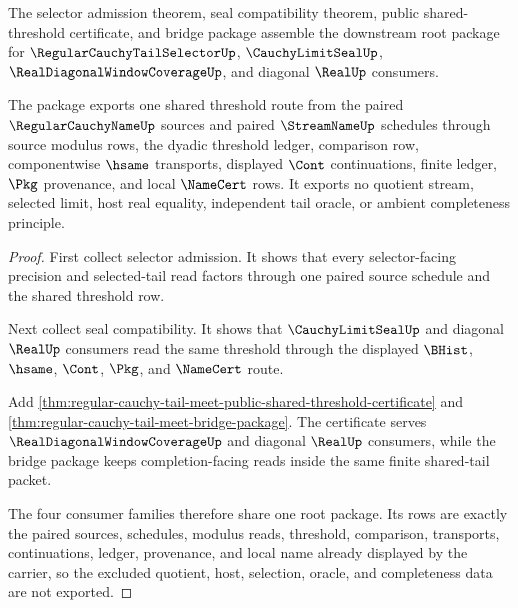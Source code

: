 \begin{theorem}
\label{thm:regular-cauchy-tail-meet-root-consumer-package}
The selector admission theorem, seal compatibility theorem, public shared-threshold certificate, and bridge package assemble the downstream root package for $\RegularCauchyTailSelectorUp$, $\CauchyLimitSealUp$, $\RealDiagonalWindowCoverageUp$, and diagonal $\RealUp$ consumers.

The package exports one shared threshold route from the paired $\RegularCauchyNameUp$ sources and paired $\StreamNameUp$ schedules through source modulus rows, the dyadic threshold ledger, comparison row, componentwise $\hsame$ transports, displayed $\Cont$ continuations, finite ledger, $\Pkg$ provenance, and local $\NameCert$ rows. It exports no quotient stream, selected limit, host real equality, independent tail oracle, or ambient completeness principle.
\end{theorem}
\begin{proof}
First collect selector admission. It shows that every selector-facing precision and selected-tail read factors through one paired source schedule and the shared threshold row.

Next collect seal compatibility. It shows that $\CauchyLimitSealUp$ and diagonal $\RealUp$ consumers read the same threshold through the displayed $\BHist$, $\hsame$, $\Cont$, $\Pkg$, and $\NameCert$ route.

Add \autoref{thm:regular-cauchy-tail-meet-public-shared-threshold-certificate} and \autoref{thm:regular-cauchy-tail-meet-bridge-package}. The certificate serves $\RealDiagonalWindowCoverageUp$ and diagonal $\RealUp$ consumers, while the bridge package keeps completion-facing reads inside the same finite shared-tail packet.

The four consumer families therefore share one root package. Its rows are exactly the paired sources, schedules, modulus reads, threshold, comparison, transports, continuations, ledger, provenance, and local name already displayed by the carrier, so the excluded quotient, host, selection, oracle, and completeness data are not exported.
\end{proof}

